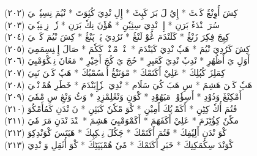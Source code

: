 \documentclass[a4paper, 10pt]{report}
\begin{document}
\begin{center}
\textarabic{(٢٠٢) \textcolor{mygreen}{كِشَ أُوِنْڠَ كَئٖٹَ  * إِيُ لَ بَرَ كَپِٹَ  * إِلِ نْدِيَ كُئِوَتَ  * نْيُمَ نِسِپٗرٖجٖيَ }} 
\\[5mm] 

\textarabic{(٢٠٣) \textcolor{mygreen}{سُرَ نٖنْدَءٗ بَرَنِ  * إِلٖ نْدِيَ سِئِيٗنِ  * هُؤٗنَ نِكٗ بَرَنِ  * زٗتٖ زِمٖنِپٗتٖيَ }} 
\\[5mm] 

\textarabic{(٢٠٤) \textcolor{mygreen}{كِپِجَ فِكِرَ زَنْڠُ  * كَلَنْدَمَ ڠُوْ لَنْڠُ  * نَرُدِيَ پَلٖ پَنْڠُ  * كِشَ نْيُمَ كَرٖجٖيَ }} 
\\[5mm] 

\textarabic{(٢٠٥) \textcolor{mygreen}{كِشَ كَرُدِيَ نْيُمَ  * هَپٗ نْدِيَ كَيَنْدَمَ  * پٖنْيٖ مْٹٖنْدٖ كَكٗمَ  * صَالَ إِمٖنِسِمَمِيَ }} 
\\[5mm] 

\textarabic{(٢٠٦) \textcolor{mygreen}{أَوَلِ يَ أَظُهُرِ  * نْدِپٗ نْدِيَ كَعَبِرِ  * حُجَ يَ كُجَ أَخِيْرِ  * مَعَانَ نِمٖكْوَمْبِيَ }} 
\\[5mm] 

\textarabic{(٢٠٧) \textcolor{mygreen}{كِمَلِزَ كُپُلِكَ  * عَلِيْ أَكَتَمْكَ  * مْوَنَنْڠُ أُمٖسُمْبُكَ  * هَپٗ كَنٖنَ نَبِيَ }} 
\\[5mm] 

\textarabic{(٢٠٨) \textcolor{mygreen}{هَپٗ كَنٖنَ هَشِمَ  * سِ هَبَ كُيَ سَلَام  * نْدِيَ مٖزٗإِيَنْدَمَ  * خَطَرِ هُمْزٖنْڠٖيَ }} 
\\[5mm] 

\textarabic{(٢٠٩) \textcolor{mygreen}{أَمْكِنْڠَ وَدُوْدِ  * أَسِؤٗوْنٖ مَيَهُوْدِ  * كْوَنِ وَنْڠَلِمْزِدِ  * وَٹُ وَنْڠِ سِ مْمٗيَ }} 
\\[5mm] 

\textarabic{(٢١٠) \textcolor{mygreen}{فَتُمَ أُكٗ كِٹِنِ  * أَكَمْوٖپُكَ أَمِيْنِ  * كْوَ مْكٗنٗ كَبَئِنِ  * نَ نْدَنِ كَمُأَمْكُوَ }} 
\\[5mm] 

\textarabic{(٢١١) \textcolor{mygreen}{مكٗنٗ كِؤُٹِزَمَ  * عَلِيْ أَكَفَهَمَ  * أَكَمْوَمْبِيَ هَشِمَ  * نٖنْدَ نْدَنِ مَرَ مٗيَ }} 
\\[5mm] 

\textarabic{(٢١٢) \textcolor{mygreen}{كْوَ نْدَنِ أَلِپٗفِكَ  * فَتُمَ أَكَتَمْكَ  * چَكُلَ نِمٖكِپِكَ  * هَيَتَسَ كْوَنْدِكِوَ }} 
\\[5mm] 

\textarabic{(٢١٣) \textcolor{mygreen}{كْوَنْدَ سِكُمَكِنِكَ  * خَبَرِ أَكَتَمْكَ  * مٗيٗ هُمْپَپَٹِكَ  * كْوَ أُثَقِلِ وَ نْدِيَ }} 
\\[5mm] 


\end{center}
\end{document}
